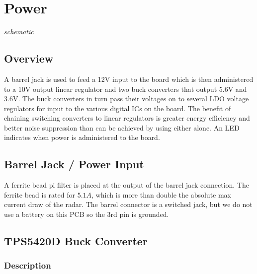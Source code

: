 \section{Power}
\label{sec:power}
\textit{\hyperlink{schematic.8}{schematic}}



\subsection{Overview}
\label{sec:power-overview}

A barrel jack is used to feed a 12V input to the board which is then administered to a 10V output
linear regulator and two buck converters that output 5.6V and 3.6V. The buck converters in turn pass
their voltages on to several LDO voltage regulators for input to the various digital ICs on the
board. The benefit of chaining switching converters to linear regulators is greater energy
efficiency and better noise suppression than can be achieved by using either alone. An LED indicates
when power is administered to the board.

\subsection{Barrel Jack / Power Input}
\label{sec:power-input}

A ferrite bead pi filter is placed at the output of the barrel jack connection. The ferrite bead is
rated for $5.1A$, which is more than double the absolute max current draw of the radar. The barrel
connector is a switched jack, but we do not use a battery on this PCB so the 3rd pin is grounded.

\subsection{TPS5420D Buck Converter}
\label{sec:tps5420d}

\subsubsection{Description}
\label{sec:tps5420d-description}

